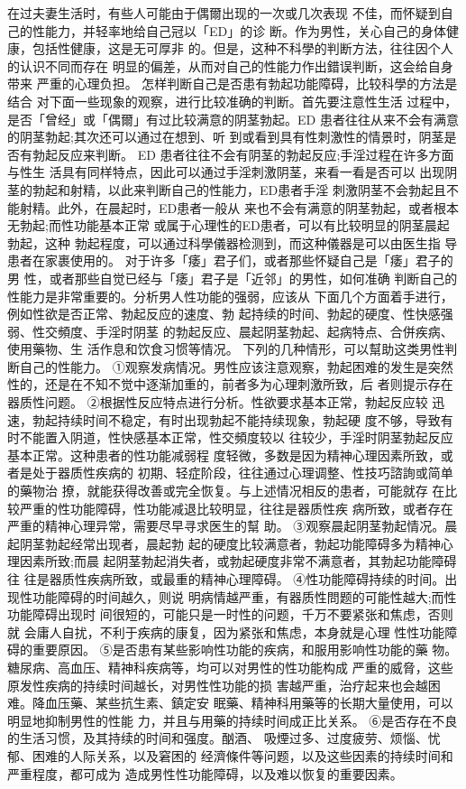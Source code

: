 \documentclass[12pt,UTF8]{ctexbook}
\begin{document}
在过夫妻生活时，有些人可能由于偶爾出现的一次或几次表现
不佳，而怀疑到自己的性能力，并轻率地给自己冠以「ED」的诊
断。作为男性，关心自己的身体健康，包括性健康，这是无可厚非
的。但是，这种不科學的判断方法，往往因个人的认识不同而存在
明显的偏差，从而对自己的性能力作出錯误判断，这会给自身带来
严重的心理负担。
怎样判断自己是否患有勃起功能障碍，比较科學的方法是结合
对下面一些现象的观察，进行比较准确的判断。首先要注意性生活
过程中，是否「曾经」或「偶爾」有过比较满意的阴茎勃起。ED
患者往往从来不会有满意的阴茎勃起;其次还可以通过在想到、听
到或看到具有性刺激性的情景时，阴茎是否有勃起反应来判断。
ED 患者往往不会有阴茎的勃起反应;手淫过程在许多方面与性生
活具有同样特点，因此可以通过手淫刺激阴茎，来看一看是否可以
出现阴茎的勃起和射精，以此来判断自己的性能力，ED患者手淫
刺激阴茎不会勃起且不能射精。此外，在晨起时，ED患者一般从
来也不会有满意的阴茎勃起，或者根本无勃起;而性功能基本正常
或属于心理性的ED患者，可以有比较明显的阴茎晨起勃起，这种
勃起程度，可以通过科學儀器检测到，而这种儀器是可以由医生指
导患者在家裹使用的。
对于许多「痿」君子们，或者那些怀疑自己是「痿」君子的男
性，或者那些自觉已经与「痿」君子是「近邻」的男性，如何准确
判断自己的性能力是非常重要的。分析男人性功能的强弱，应该从
下面几个方面着手进行，例如性欲是否正常、勃起反应的速度、勃
起持续的时间、勃起的硬度、性快感强弱、性交頻度、手淫时阴茎
的勃起反应、晨起阴茎勃起、起病特点、合併疾病、使用藥物、生
活作息和饮食习惯等情况。
下列的几种情形，可以幫助这类男性判断自己的性能力。
①观察发病情况。男性应该注意观察，勃起困难的发生是突然
性的，还是在不知不觉中逐渐加重的，前者多为心理刺激所致，后
者则提示存在器质性问题。
②根据性反应特点进行分析。性欲要求基本正常，勃起反应较
迅速，勃起持续时间不稳定，有时出现勃起不能持续现象，勃起硬
度不够，导致有时不能置入阴道，性快感基本正常，性交頻度较以
往较少，手淫时阴茎勃起反应基本正常。这种患者的性功能减弱程
度轻微，多数是因为精神心理因素所致，或者是处于器质性疾病的
初期、轻症阶段，往往通过心理调整、性技巧諮詢或简单的藥物治
撩，就能获得改善或完全恢复。与上述情况相反的患者，可能就存
在比较严重的性功能障碍，性功能减退比较明显，往往是器质性疾
病所致，或者存在严重的精神心理异常，需要尽早寻求医生的幫
助。
③观察晨起阴茎勃起情况。晨起阴茎勃起经常出现者，晨起勃
起的硬度比较满意者，勃起功能障碍多为精神心理因素所致;而晨
起阴茎勃起消失者，或勃起硬度非常不满意者，其勃起功能障碍往
往是器质性疾病所致，或最重的精神心理障碍。
④性功能障碍持续的时间。出现性功能障碍的时间越久，则说
明病情越严重，有器质性問题的可能性越大;而性功能障碍出现时
间很短的，可能只是一时性的问题，千万不要紧张和焦虑，否则就
会庸人自扰，不利于疾病的康复，因为紧张和焦虑，本身就是心理
性性功能障碍的重要原因。
⑤是否患有某些影响性功能的疾病，和服用影响性功能的藥
物。糖尿病、高血压、精神科疾病等，均可以对男性的性功能构成
严重的威脅，这些原发性疾病的持续时间越长，对男性性功能的损
害越严重，治疗起来也会越困难。降血压藥、某些抗生素、鎮定安
眠藥、精神科用藥等的长期大量使用，可以明显地抑制男性的性能
力，并且与用藥的持续时间成正比关系。
⑥是否存在不良的生活习惯，及其持续的时间和强度。酗酒、
吸煙过多、过度疲劳、烦惱、忧郁、困难的人际关系，以及窘困的
经濟條件等问题，以及这些因素的持续时间和严重程度，都可成为
造成男性性功能障碍，以及难以恢复的重要因素。
\end{document}
